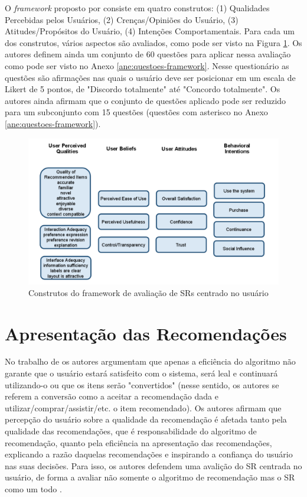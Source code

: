 O \textit{framework} proposto por  consiste em quatro construtos: (1) Qualidades Percebidas pelos
Usuários, (2) Crenças/Opiniões do Usuário, (3) Atitudes/Propósitos do Usuário, (4) Intenções Comportamentais.
Para cada um dos construtos, vários aspectos são avaliados, como pode ser visto na Figura \ref{fig:resque-framework}.
Os autores definem ainda um conjunto de 60 questões para aplicar nessa avaliação como pode ser visto no Anexo
\ref{ane:questoes-framework}. Nesse questionário as questões são afirmações nas quais o usuário deve ser posicionar em
um escala de Likert de 5 pontos, de "Discordo totalmente" até "Concordo totalmente". Os autores ainda afirmam que o
conjunto de questões aplicado pode ser reduzido para um subconjunto com 15 questões (questões com asterisco no Anexo
\ref{ane:questoes-framework}).

\begin{figure}[htb]
  \caption{\label{fig:resque-framework}Construtos do framework de avaliação de SRs centrado no usuário}
  \begin{center}
      \includegraphics[scale=0.6]{./Figuras/resque-framework.png}
  \end{center}
\end{figure}

\section{Apresentação das Recomendações}\label{section:fundamentacao-apresentacao-recomendacao}

No trabalho de  os autores argumentam que apenas a eficiência do algoritmo não garante
que o usuário estará satisfeito com o sistema, será leal e continuará utilizando-o ou que os itens serão "convertidos"
(nesse sentido, os autores se referem a conversão como a aceitar a recomendação dada e utilizar/comprar/assistir/etc.
o item recomendado). Os autores afirmam que percepção do usuário sobre a qualidade da recomendação é afetada tanto pela
qualidade das recomendações, que é responsabilidade do algoritmo de recomendação, quanto pela eficiência na apresentação
das recomendações, explicando a razão daquelas recomendações e inspirando a confiança do usuário nas suas decisões.
Para isso, os autores defendem uma avalição do SR centrada no usuário, de forma a avaliar não somente o algoritmo de
recomendação mas o SR como um todo \cite{pu2012evaluating}.

